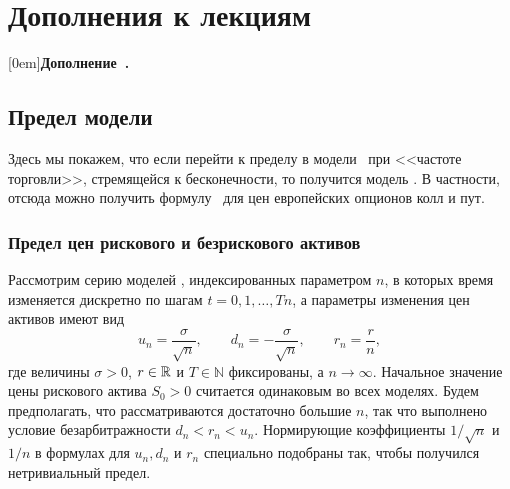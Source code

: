 \stopchaptertoc

\part{Дополнения к лекциям}
[0em]{}{\textbf{Дополнение\ \thecontentslabel.}\hspace{2mm}}{}{\dotfill\contentspage}
\setcounter{chapter}{0}
\renewcommand{\theHchapter}{A\arabic{chapter}}%


\chapter{Предел модели \crr}
\label{ch:crr-limit}

Здесь мы покажем, что если перейти к пределу в модели \crr\ при <<частоте торговли>>, стремящейся к бесконечности, то получится модель \bs.
В частности, отсюда можно получить формулу \bs\ для цен европейских опционов колл и пут.

\section{Предел цен рискового и безрискового активов}

Рассмотрим серию моделей \crr, индексированных параметром $n$, в которых время изменяется дискретно по шагам $t=0,1,\dots,Tn$, а параметры изменения цен активов имеют вид
\[
u_n = \frac{\sigma}{\sqrt n}, \qquad d_n = -\frac{\sigma}{\sqrt n}, \qquad r_n = \frac{r}{n},
\]
где величины $\sigma>0$, $r\in \mathbb{R}$ и $T\in\mathbb{N}$ фиксированы, а $n\to\infty$. Начальное значение цены рискового актива $S_0>0$ считается одинаковым во всех моделях. 
Будем предполагать, что рассматриваются достаточно большие $n$, так что выполнено условие безарбитражности $d_n < r_n < u_n$.
Нормирующие коэффициенты $1/\sqrt{n}$ и $1/n$ в формулах для $u_n,d_n$ и $r_n$ специально подобраны так, чтобы получился нетривиальный предел.

